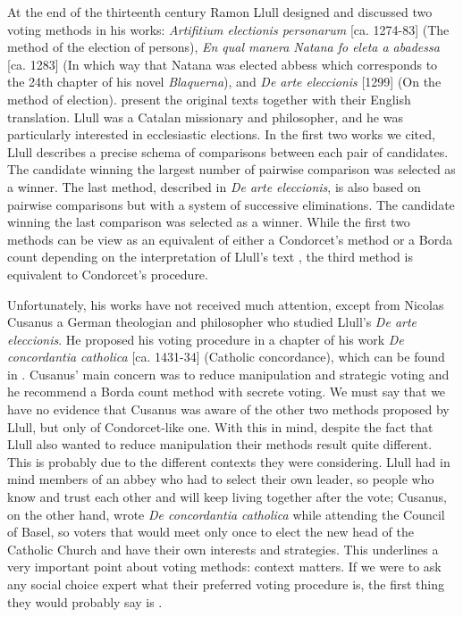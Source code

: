 At the end of the thirteenth century Ramon Llull designed and discussed two voting methods in his works: \textit{Artifitium electionis personarum} [ca. 1274-83] (The method of the election of persons), \textit{En qual manera Natana fo eleta a abadessa} [ca. 1283] (In which way that Natana was elected abbess which corresponds to the 24th chapter of his novel \textit{Blaquerna}), and \textit{De arte eleccionis} [1299] (On the method of election). \cite{Hagele2001} present the original texts together with their English translation. Llull was a Catalan missionary and philosopher, and he was particularly interested in ecclesiastic elections. In the first two works we cited, Llull describes a precise schema of comparisons between each pair of candidates. The candidate winning the largest number of pairwise comparison was selected as a winner. The last method, described in \textit{De arte eleccionis}, is also based on pairwise comparisons but with a system of successive eliminations. The candidate winning the last comparison was selected as a winner. While the first two methods can be view as an equivalent of either a Condorcet's method or a Borda count depending on the interpretation of Llull's text \citep{McLean1990}, the third method is equivalent to Condorcet's procedure.

Unfortunately, his works have not received much attention, except from Nicolas Cusanus a German theologian and philosopher who studied Llull's \textit{De arte eleccionis}. He proposed his voting procedure in a chapter of his work \textit{De concordantia catholica} [ca. 1431-34] (Catholic concordance), which can be found in \citet[Chapter 4]{McLeanUrken1995}. Cusanus' main concern was to reduce manipulation and strategic voting and he recommend a Borda count method with secrete voting. We must say that we have no evidence that Cusanus was aware of the other two methods proposed by Llull, but only of Condorcet-like one. With this in mind, despite the fact that Llull also wanted to reduce manipulation their methods result quite different. This is probably due to the different contexts they were considering. Llull had in mind members of an abbey who had to select their own leader, so people who know and trust each other and will keep living together after the vote; Cusanus, on the other hand, wrote \textit{De concordantia catholica} while attending the Council of Basel, so voters that would meet only once to elect the new head of the Catholic Church and have their own interests and strategies. This underlines a very important point about voting methods: context matters. If we were to ask any social choice expert what their preferred voting procedure is, the first thing they would probably say is .



